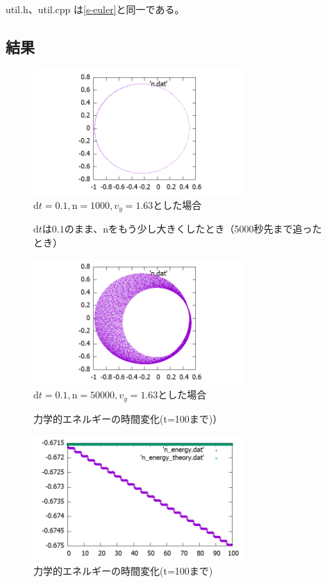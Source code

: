\documentclass[a4paper,twoside]{jarticle}
\begin{document}
util.h、util.cpp は\ref{s-euler}と同一である。

\subsection{結果}
\begin{figure}[H]
\begin{center}
\includegraphics[width=8cm]{../cpp/out/runge-kutta/n.png}
\end{center}
\caption{$\mathrm{d}t=0.1, \mathrm{n}=1000, v_y=1.63$とした場合}
\end{figure}

\begin{figure}[H]
$\mathrm{d}t$は$0.1$のまま、nをもう少し大きくしたとき（5000秒先まで追ったとき）
\begin{center}
\includegraphics[width=8cm]{../cpp/out/runge-kutta/n_dt=e-1_n=50000.png}
\end{center}
\caption{$\mathrm{d}t=0.1, \mathrm{n}=50000, v_y=1.63$とした場合}
\end{figure}

\begin{figure}[H]
力学的エネルギーの時間変化(t=100まで)）
\begin{center}
\includegraphics[width=8cm]{../cpp/out/runge-kutta/n_energy.png}
\end{center}
\caption{力学的エネルギーの時間変化(t=100まで)}
\end{figure}
\end{document}
